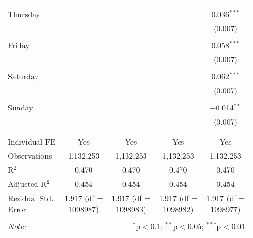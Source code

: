 \documentclass[
]{article}
\begin{document}
\begin{table}[!htbp]
{\begin{tabular}{@{\extracolsep{5pt}}lcccc}
  & & & & \\ 
 Thursday &  &  &  & 0.036$^{***}$ \\ 
  &  &  &  & (0.007) \\ 
  & & & & \\ 
 Friday &  &  &  & 0.058$^{***}$ \\ 
  &  &  &  & (0.007) \\ 
  & & & & \\ 
 Saturday &  &  &  & 0.062$^{***}$ \\ 
  &  &  &  & (0.007) \\ 
  & & & & \\ 
 Sunday &  &  &  & $-$0.014$^{**}$ \\ 
  &  &  &  & (0.007) \\ 
  & & & & \\ 
\hline \\[-1.8ex] 
Individual FE & Yes & Yes & Yes & Yes \\ 
Observations & 1,132,253 & 1,132,253 & 1,132,253 & 1,132,253 \\ 
R$^{2}$ & 0.470 & 0.470 & 0.470 & 0.470 \\ 
Adjusted R$^{2}$ & 0.454 & 0.454 & 0.454 & 0.454 \\ 
Residual Std. Error & 1.917 (df = 1098987) & 1.917 (df = 1098983) & 1.917 (df = 1098982) & 1.917 (df = 1098977) \\ 
\hline 
\hline \\[-1.8ex] 
\textit{Note:}  & \multicolumn{4}{r}{$^{*}$p$<$0.1; $^{**}$p$<$0.05; $^{***}$p$<$0.01} \\ 
\end{tabular}
} 
\end{table} 
\newpage
\end{document}

